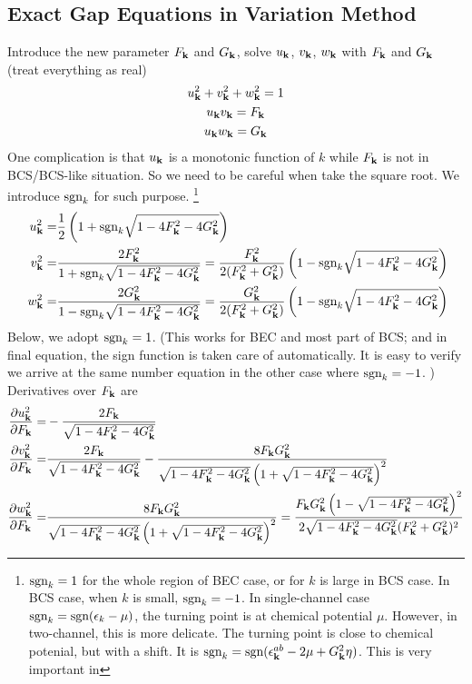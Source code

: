 \subsection{Exact Gap Equations in Variation Method}
Introduce the new parameter $F_{\mathbf{k}}$ and $G_{\mathbf{k}}$,  solve $u_{\mathbf{k}}$, $v_{\mathbf{k}}$, $w_{\mathbf{k}}$ with $F_{\mathbf{k}}$ and $G_{\mathbf{k}}$ (treat everything as real)
\begin{gather}
u_{\mathbf{k}}^2+v^{2}_{\mathbf{k}}+w^{2}_{\mathbf{k}}=1\\
u_{\mathbf{k}}v_{\mathbf{k}}=F_{\mathbf{k}}\\
u_{\mathbf{k}}w_{\mathbf{k}}=G_{\mathbf{k}}
\end{gather}
One complication is that $u_{\mathbf{k}}$ is a monotonic function of $k$ while $F_{\mathbf{k}}$ is not in BCS/BCS-like situation.  So we need to be careful when take the square root.  We introduce $\text{sgn}_k$ for such purpose.  \footnote{\label{foot:20100909:sgn} $\text{sgn}_k=1$  for the whole region of BEC case, or for $k$ is large in BCS case. In BCS case, when $k$ is small, $\text{sgn}_{k}=-1$.  In single-channel case $\text{sgn}_{k}=\text{sgn}(\epsilon_{k}-\mu)$, the turning point is at chemical potential $\mu$.  However, in two-channel, this is more delicate.  The turning point is close to chemical potenial, but with a shift. It is $\text{sgn}_k=\text{sgn}(\epsilon^{ab}_{\mathbf{k}}-2\mu+  G_{\mathbf{k}}^2\eta)$.  This is very important in }
\begin{equation}
\begin{split}
u_{\mathbf{k}}^2=&\frac{1}{2} \left(1+\text{sgn}_{k}\sqrt{1-4 F_{\mathbf{k}}^2-4 G_{\mathbf{k}}^2}\right)\\
v^{2}_{\mathbf{k}}=&\frac{2 F_{\mathbf{k}}^2}{1+\text{sgn}_{k}\sqrt{1-4 F_{\mathbf{k}}^2-4 G_{\mathbf{k}}^2}}
=\frac{ F_{\mathbf{k}}^2}{2( F_{\mathbf{k}}^2+ G_{\mathbf{k}}^2)} \left(1-\text{sgn}_{k}\sqrt{1-4 F_{\mathbf{k}}^2-4 G_{\mathbf{k}}^2}\right)\\\
w^{2}_{\mathbf{k}}=&\frac{2 G_{\mathbf{k}}^2}{1-\text{sgn}_{k}\sqrt{1-4 F_{\mathbf{k}}^2-4 G_{\mathbf{k}}^2}}
=\frac{G_{\mathbf{k}}^2}{2( F_{\mathbf{k}}^2+ G_{\mathbf{k}}^2)} \left(1-\text{sgn}_{k}\sqrt{1-4 F_{\mathbf{k}}^2-4 G_{\mathbf{k}}^2}\right)
\end{split}
\end{equation}
Below, we adopt $\text{sgn}_k=1$. (This works for BEC and most part of BCS; and in final equation, the sign function is taken care of automatically.  It is easy to verify we arrive at the same number equation in the other case where $\text{sgn}_{k}=-1$. ) Derivatives over $F_{\mathbf{k}}$ are
\begin{equation}
\begin{split}
\frac{\partial{u_{\ensuremath{\mathbf{k}}}^2}}{\partial{F_{\ensuremath{\mathbf{k}}}}}=&-\frac{2 F_{\mathbf{k}}}{\sqrt{1-4 F_{\mathbf{k}}^2-4 G_{\mathbf{k}}^2}}\\
\frac{\partial{v_{\ensuremath{\mathbf{k}}}^2}}{\partial{F_{\ensuremath{\mathbf{k}}}}}=&\frac{2 F_{\mathbf{k}}}{\sqrt{1-4 F_{\mathbf{k}}^2-4 G_{\mathbf{k}}^2}}-\frac{8 F_{\mathbf{k}} G_{\mathbf{k}}^2}{\sqrt{1-4 F_{\mathbf{k}}^2-4 G_{\mathbf{k}}^2} \left(1+\sqrt{1-4 F_{\mathbf{k}}^2-4 G_{\mathbf{k}}^2}\right)^2}\\
\frac{\partial{w_{\ensuremath{\mathbf{k}}}^2}}{\partial{F_{\ensuremath{\mathbf{k}}}}}=&\frac{8 F_{\mathbf{k}} G_{\mathbf{k}}^2}{\sqrt{1-4 F_{\mathbf{k}}^2-4 G_{\mathbf{k}}^2} \left(1+\sqrt{1-4 F_{\mathbf{k}}^2-4 G_{\mathbf{k}}^2}\right)^2}
=\frac{F_{\mathbf{k}} G_{\mathbf{k}}^2 \left(1-\sqrt{1-4 F_{\mathbf{k}}^2-4 G_{\mathbf{k}}^2}\right)^2}{2\sqrt{1-4 F_{\mathbf{k}}^2-4 G_{\mathbf{k}}^2} (F_{\mathbf{k}}^2 + G_{\mathbf{k}}^2)^2}
\end{split}
\end{equation}
